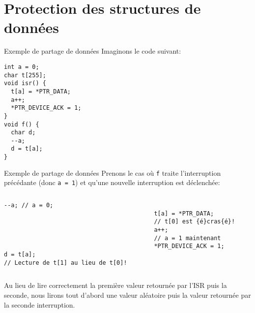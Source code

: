 \section{Protection des structures de données}

\begin{frame}[fragile]{Exemple de partage de données}
  Imaginons le code suivant:
  \begin{lstlisting}
int a = 0;
char t[255];
void isr() {
  t[a] = *PTR_DATA;
  a++;
  *PTR_DEVICE_ACK = 1;
}
void f() {
  char d;
  --a;
  d = t[a];
}
  \end{lstlisting}
\end{frame} 

\begin{frame}[fragile]{Exemple de partage de données}
  Prenons le  cas où  \verb+f+ traite l'interruption  précédante (donc
  \verb+a = 1+) et qu'une nouvelle interruption est déclenchée:
  \begin{columns}
    \begin{column}{5cm}
      \begin{lstlisting}[showlines=true,emptylines=10]
--a; // a = 0;





d = t[a];
// Lecture de t[1] au lieu de t[0]!
       \end{lstlisting}
     \end{column}
     \begin{column}{5cm}
      \begin{lstlisting}[showlines=true,emptylines=10,escapeinside=\{\}]

t[a] = *PTR_DATA; 
// t[0] est {é}cras{é}!
a++;
// a = 1 maintenant
*PTR_DEVICE_ACK = 1;


       \end{lstlisting}
    \end{column}
  \end{columns}
  Au lieu de lire correctement  la première valeur retournée par l'ISR
  puis la seconde, nous lirons  tout d'abord une valeur aléatoire puis
  la valeur retournée par la seconde interruption.
\end{frame} 

